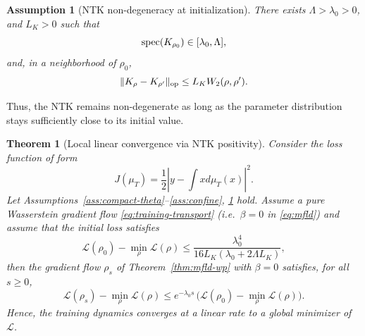 \documentclass[11pt,a4wide]{article}
\newtheorem{theorem}{Theorem}[section]
\newtheorem{assumption}{Assumption}
\theoremstyle{definition}
\begin{document}
\begin{assumption}[NTK non-degeneracy at initialization]
\label{ass:ntk} 
There exists $\Lambda >  \lambda_0>0$,  and $L_K>0$ such that 
$$
 {\rm spec}  (K_{\rho_0}) \in [\lambda_0,  \Lambda], 
$$
and, in a neighborhood of $\rho_0$, 
$$
\|K_\rho -K_{\rho'}\|_{\rm op} \leq L_K W_2(\rho, \rho').  
$$
\end{assumption}
Thus, the NTK remains non-degenerate as long as the parameter distribution stays sufficiently close to its initial value.
\begin{theorem}[Local linear convergence via NTK positivity]
\label{thm:ntk-conv} Consider the loss function of form 
$$
J(\mu_T)=\frac{1}{2} \left|y- \int x d\mu_T(x) \right|^2. 
$$
Let Assumptions~\ref{ass:compact-theta}--\ref{ass:confine}, \ref{ass:ntk} hold. Assume a pure Wasserstein gradient flow \eqref{eq:training-transport} (i.e.\ $\beta=0$ in \eqref{eq:mfld}) and assume that  the initial loss satisfies
\begin{equation}\label{ini}
\mathcal L(\rho_0) - \min_\rho \mathcal L(\rho) \le \frac{ \lambda_0^4}{16  L_K (\lambda_0+2\Lambda L_K)},
\end{equation}
then the gradient flow $\rho_s$ of Theorem~\ref{thm:mfld-wp} with $\beta=0$ satisfies, for all $s\ge0$,
\begin{equation}
\mathcal L(\rho_s) - \min_\rho\mathcal L(\rho) \le e^{-\lambda_0 s}\,\big(\mathcal L(\rho_0)-\min_\rho\mathcal L(\rho)\big).
\end{equation}
Hence, the training dynamics converges at a linear rate to a global minimizer of $\mathcal L$.
\end{theorem}
\end{document}
